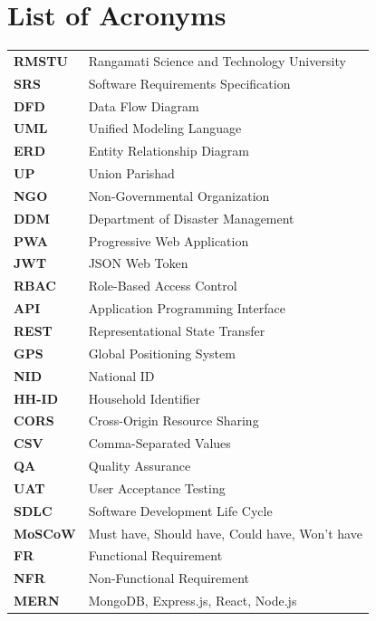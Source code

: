 \documentclass[11pt,a4paper]{report}
\begin{document}
\pagestyle{romanpages}
\setcounter{page}{1}

\tableofcontents
\clearpage

\listoftables
{}
\clearpage

\listoffigures
{}
\clearpage

\chapter*{List of Acronyms}

\begin{tabularx}{\textwidth}{@{}lX@{}}
\textbf{RMSTU}    & Rangamati Science and Technology University \\
\textbf{SRS}      & Software Requirements Specification \\
\textbf{DFD}      & Data Flow Diagram \\
\textbf{UML}      & Unified Modeling Language \\
\textbf{ERD}      & Entity Relationship Diagram \\
\textbf{UP}       & Union Parishad \\
\textbf{NGO}      & Non-Governmental Organization \\
\textbf{DDM}      & Department of Disaster Management \\
\textbf{PWA}      & Progressive Web Application \\
\textbf{JWT}      & JSON Web Token \\
\textbf{RBAC}     & Role-Based Access Control \\
\textbf{API}      & Application Programming Interface \\
\textbf{REST}     & Representational State Transfer \\
\textbf{GPS}      & Global Positioning System \\
\textbf{NID}      & National ID \\
\textbf{HH-ID}    & Household Identifier \\
\textbf{CORS}     & Cross-Origin Resource Sharing \\
\textbf{CSV}      & Comma-Separated Values \\
\textbf{QA}       & Quality Assurance \\
\textbf{UAT}      & User Acceptance Testing \\
\textbf{SDLC}     & Software Development Life Cycle \\
\textbf{MoSCoW}   & Must have, Should have, Could have, Won't have \\
\textbf{FR}       & Functional Requirement \\
\textbf{NFR}      & Non-Functional Requirement \\
\textbf{MERN}     & MongoDB, Express.js, React, Node.js \\
\end{tabularx}
\end{document}

